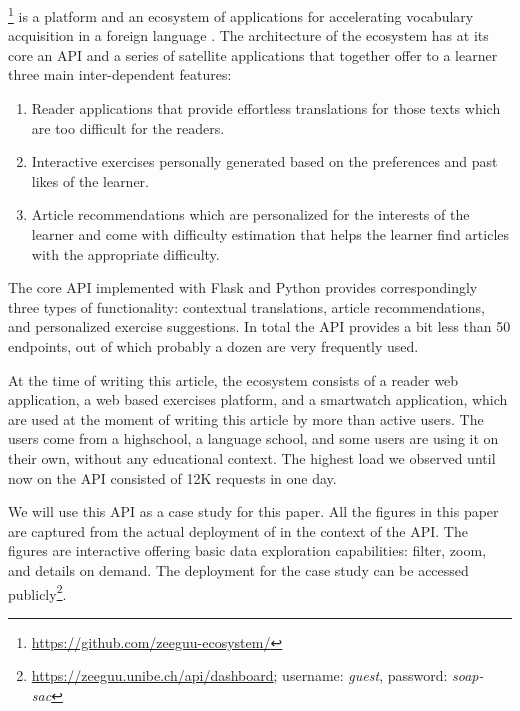 \documentclass[conference]{IEEEtran}
\begin{document}

  \zee\footnote{\url{https://github.com/zeeguu-ecosystem/}} is a platform and an ecosystem of applications for accelerating vocabulary acquisition in a foreign language \cite{Lungu16}. 
%
  The architecture of the ecosystem has at its core an API and a series of satellite applications that together offer to a learner three main inter-dependent features:

  \begin{enumerate}

    \item Reader applications that provide effortless translations for those texts which are too difficult for the readers.

    \item Interactive exercises personally generated based on the preferences and past likes of the learner.

    \item Article recommendations which are personalized for the interests of the learner and come with difficulty estimation that helps the learner find articles with the appropriate difficulty.

  \end{enumerate}

  The core API implemented with Flask and Python provides correspondingly three types of functionality: contextual translations, article recommendations, and personalized exercise suggestions. In total the API provides a bit less than 50 endpoints, out of which probably a dozen are very frequently used. 

  At the time of writing this article, the ecosystem consists of a reader web application, a web based exercises platform, and a smartwatch application, which are used at the moment of writing this article by more than \activeUserCount active users. The users come from a highschool, a language school, and some users are using it on their own, without any educational context. The highest load we observed until now on the API consisted of 12K requests in one day.

  
  We will use this \zee API as a case study for this paper. 
  All the figures in this paper are captured from the actual deployment of \tool in the context of the \zee API. The figures are interactive offering basic data exploration capabilities: filter, zoom, and details on demand\cite{Shne99a}. The \tool deployment for the case study can be accessed publicly\footnote{\url{https://zeeguu.unibe.ch/api/dashboard}; username: {\em guest}, password: {\em soap-sac}}. 
\end{document}
